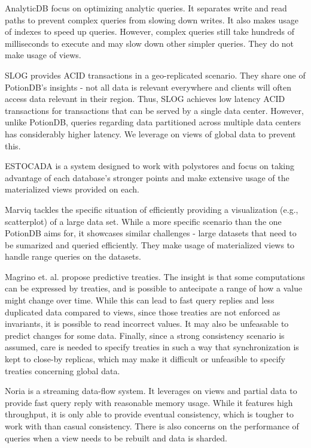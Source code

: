 \documentclass[sigplan,10pt]{acmart}
\begin{document}
AnalyticDB \cite{analyticdb} focus on optimizing analytic queries. 
It separates write and read paths to prevent complex queries from slowing down writes. 
It also makes usage of indexes to speed up queries.
However, complex queries still take hundreds of milliseconds to execute and may slow down other simpler queries.
They do not make usage of views.

SLOG \cite{slog} provides ACID transactions in a geo-replicated scenario.
They share one of PotionDB's insights - not all data is relevant everywhere and clients will often access data relevant in their region.
Thus, SLOG achieves low latency ACID transactions for transactions that can be served by a single data center.
However, unlike PotionDB, queries regarding data partitioned across multiple data centers has considerably higher latency.
We leverage on views of global data to prevent this.

ESTOCADA \cite{estocada} is a system designed to work with polystores and focus on taking advantage of each database's stronger points and make extensive usage of the materialized views provided on each.

Marviq \cite{marviq} tackles the specific situation of efficiently providing a visualization (e.g., scatterplot) of a large data set.
While a more specific scenario than the one PotionDB aims for, it showcases similar challenges - large datasets that need to be sumarized and queried efficiently.
They make usage of materialized views to handle range queries on the datasets.

Magrino et. al. \cite{treaties} propose predictive treaties. 
The insight is that some computations can be expressed by treaties, and is possible to antecipate a range of how a value might change over time.
While this can lead to fast query replies and less duplicated data compared to views, since those treaties are not enforced as invariants, it is possible to read incorrect values.
It may also be unfeasable to predict changes for some data.
Finally, since a strong consistency scenario is assumed, care is needed to specify treaties in such a way that synchronization is kept to close-by replicas, which may make it difficult or unfeasible to specify treaties concerning global data.

Noria \cite{noria} is a streaming data-flow system. 
It leverages on views and partial data to provide fast query reply with reasonable memory usage.
While it features high throughput, it is only able to provide eventual consistency, which is tougher to work with than casual consistency.
There is also concerns on the performance of queries when a view needs to be rebuilt and data is sharded.
\end{document}
